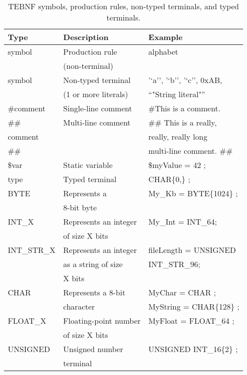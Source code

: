\begin{table}[h]
\begin{center}
\caption{TEBNF symbols, production rules, non-typed terminals, and typed terminals.}
\label{TEBNFSymbols}
\begin{tabular}{|l|l|l|} \hline
\textbf{Type} & \textbf{Description} & \textbf{Example} \\ \hline \hline
symbol & Production rule  & alphabet \\
       &(non-terminal)    &          \\ \hline
symbol & Non-typed terminal   & '‘a'’, '‘b’', '‘c'’, 0xAB, \\
       & (1 or more literals) & “"String literal"”     \\ \hline                    
\#comment & Single-line comment & \#This is a comment. \\ \hline
\#\#      & Multi-line comment & \#\# This is a really,   \\
comment &                    & really, really long    \\
\#\#      &                    & multi-line comment. \#\# \\ \hline
\$var & Static variable & \$myValue = 42 ; \\ \hline
type & Typed terminal & CHAR\{0,\} ; \\ \hline
BYTE & Represents a & My\_Kb = BYTE\{1024\} ; \\
     & 8-bit byte	&                       \\ \hline
INT\_X      & Represents an integer & My\_Int = INT\_64; \\
            & of size X bits        &                  \\ \hline
INT\_STR\_X & Represents an integer & fileLength = UNSIGNED \\
            & as a string of size   & INT\_STR\_96;         \\           
            & X bits                &                       \\ \hline
CHAR        & Represents a 8-bit    & MyChar = CHAR ;        \\
            & character             & MyString = CHAR\{128\} ; \\ \hline
FLOAT\_X    & Floating-point number & MyFloat = FLOAT\_64 ; \\
            & of size X bits        &                      \\ \hline
UNSIGNED    & Unsigned number & UNSIGNED INT\_16\{2\} ; \\
            & terminal        &                      \\ \hline
\end{tabular}
\end{center}
\end{table}

